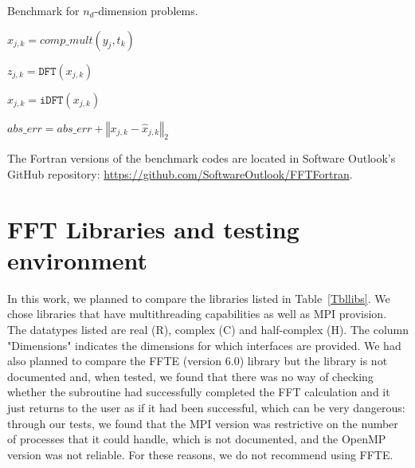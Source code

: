 \documentclass[a4paper]{article}
\newcommand{\norm}[1]{\left\Vert#1\right\Vert}
\begin{document}
\begin{algorithm}\caption{Benchmark for $n_d$-dimension problems. }\label{Alg:Bench}
\noindent \hrulefill

\begin{algorithmic}



\STATE $x_{j,k} = comp\_mult(y_j,t_k)$

\ENDFOR

\ENDFOR






\STATE $z_{j,k} = \texttt{DFT}(x_{j,k})$

\ENDFOR
\ENDFOR








\STATE $\hat{x}_{j,k} = \texttt{iDFT}(x_{j,k})$

\STATE $abs\_err = abs\_err + \norm{x_{j,k}-\hat{x}_{j,k}}_2$

\ENDFOR
\ENDFOR
\ENDIF



\end{algorithmic}
\noindent \hrulefill

\end{algorithm}

The Fortran versions of the benchmark codes are located in Software
Outlook's GitHub repository: \newline
\url{https://github.com/SoftwareOutlook/FFTFortran}.


\section{FFT Libraries and testing environment}\label{Sec:libs}

In this work, we planned to compare the libraries listed in
Table~\ref{Tbllibs}. We chose libraries that have multithreading
capabilities as well as MPI provision.  The datatypes listed are real
(R), complex (C) and half-complex (H). The column "Dimensions"
indicates the dimensions for which interfaces are provided.  We had
also planned to compare the FFTE (version 6.0) library but the library
is not documented and, when tested, we found that there was no way of
checking whether the subroutine had successfully completed the FFT
calculation and it just returns to the user as if it had been
successful, which can be very dangerous: through our tests, we found
that the MPI version was restrictive on the number of processes that
it could handle, which is not documented, and the OpenMP version was
not reliable. For these reasons, we do not recommend using FFTE.
\end{document}
